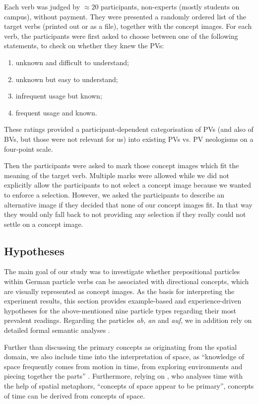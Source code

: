 \documentclass[output=paper]{langsci/langscibook}
\begin{document}
Each verb was judged by ${\approx}20$ participants, non-experts (mostly
students on campus), without payment. They were presented a randomly
ordered list of the target verbs (printed out or as a file), together
with the concept images. For each verb, the participants were first
asked to choose between one of the following statements, to check on
whether they knew the PVs:
\begin{enumerate}
\item unknown and difficult to understand;
\item unknown but easy to understand;
\item infrequent usage but known;
\item frequent usage and known.
\end{enumerate}
These ratings provided a participant-dependent categorisation of PVs
(and also of BVs, but those were not relevant for us) into existing
PVs vs. PV neologisms on a four-point scale.

Then the participants were asked to mark those concept images which
fit the meaning of the target verb. Multiple marks were allowed
while we did not explicitly allow the participants to not select a
concept image because we wanted to enforce a selection. However, we
asked the participants to describe an alternative image if they
decided that none of our concept images fit. In that way they would
only fall back to not providing any selection if they really could not
settle on a concept image.


\subsection{Hypotheses}

The main goal of our study was to investigate whether prepositional
particles within German particle verbs can be associated with
directional concepts, which are visually represented as concept
images. As the basis for interpreting the experiment results, this
section provides example-based and experience-driven hypotheses for
the above-mentioned nine particle types regarding their most prevalent
readings. Regarding the particles \textit{ab, an} and \textit{auf}, we
in addition rely on detailed formal semantic analyses
\citep{Lechler/Rossdeutscher:09, Kliche:11,Springorum:11}.

Further than discussing the primary concepts as originating from the
spatial domain, we also include time into the interpretation of space,
as ``knowledge of space frequently comes from motion in time, from
exploring environments and piecing together the parts''
\citep{Tversky:11}. Furthermore, relying on \cite{Boroditsky:01}, who
analyses time with the help of spatial metaphors, ``concepts of space
appear to be primary'', concepts of time can be derived from concepts
of space.
\end{document}
